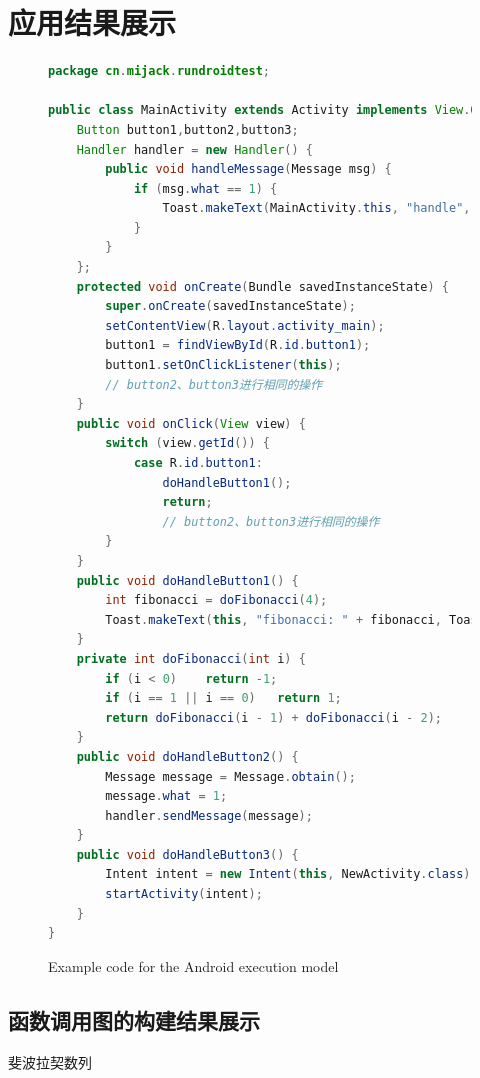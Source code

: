 \section{应用结果展示}  

\begin{figure}
	\centering
	\begin{lstlisting}[language=Java]
package cn.mijack.rundroidtest;

public class MainActivity extends Activity implements View.OnClickListener {
	Button button1,button2,button3;
	Handler handler = new Handler() {
		public void handleMessage(Message msg) {
			if (msg.what == 1) {
				Toast.makeText(MainActivity.this, "handle", Toast.LENGTH_SHORT).show();
			}
		}
	};
	protected void onCreate(Bundle savedInstanceState) {
		super.onCreate(savedInstanceState);
		setContentView(R.layout.activity_main);
		button1 = findViewById(R.id.button1);
		button1.setOnClickListener(this);
		// button2、button3进行相同的操作
	}
	public void onClick(View view) {
		switch (view.getId()) {
			case R.id.button1:
				doHandleButton1();
				return;
				// button2、button3进行相同的操作
		}
	}
	public void doHandleButton1() {
		int fibonacci = doFibonacci(4);
		Toast.makeText(this, "fibonacci: " + fibonacci, Toast.LENGTH_SHORT).show();
	}
	private int doFibonacci(int i) {
		if (i < 0)    return -1;   
		if (i == 1 || i == 0)   return 1; 
		return doFibonacci(i - 1) + doFibonacci(i - 2);
	}
	public void doHandleButton2() {
		Message message = Message.obtain();
		message.what = 1;
		handler.sendMessage(message);
	}
	public void doHandleButton3() {
		Intent intent = new Intent(this, NewActivity.class);
		startActivity(intent);
	}
}\end{lstlisting}
	\caption{Example code for the Android execution model}
	\label{fig:code_demo}
\end{figure}

\subsection{函数调用图的构建结果展示}

斐波拉契数列



